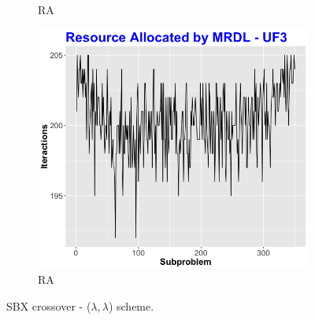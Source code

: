 \begin{figure}[!t]
\begin{subfigure}[b]{0.33\textwidth}
		\caption{RA}
	\end{subfigure}
	\begin{subfigure}[b]{0.33\textwidth}
		\centering
		\includegraphics[width=1\textwidth, height=1\textwidth]{images/Ra-mrdl-uf3}
		\caption{RA}
	\end{subfigure}
	\caption{SBX crossover - ($\lambda, \lambda$) scheme.}
	\label{RAs - UF3}
	
\end{figure}


